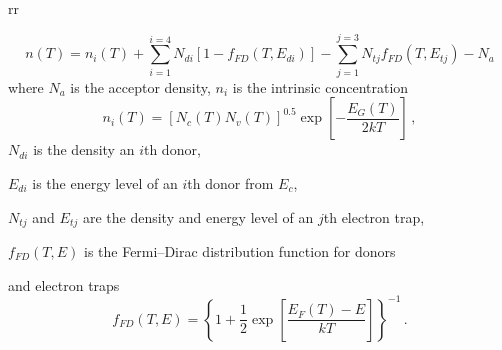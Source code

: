 \documentclass[14pt]{article}
\numberwithin{equation}{part}
\begin{document}
rr

\begin{equation*}
    n(T)=n_i(T)+\sum_{i=1}^{i=4}N_{di}[1-f_{FD}(T,E_{di})]-\sum_{j=1}^{j=3}N_{tj}f_{FD}(T,E_{tj})-N_a
\end{equation*}
where
$N_a$ is the acceptor density,
$n_i$ is the intrinsic concentration
\begin{equation*}
    n_i(T)=[N_c(T)N_v(T)]^{0.5}\exp\left[-\frac{E_G(T)}{2kT}\right]\,,
\end{equation*}
$N_{di}$ is the density an $i$th donor,

\noindent
$E_{di}$ is the energy level of an $i$th donor from $E_c$,

\noindent
$N_{tj}$ and $E_{tj}$ are the density and energy level of an $j$th electron trap,

\noindent
$f_{FD}(T,E)$ is the Fermi--Dirac distribution function for donors 

\noindent
and electron traps
\begin{equation*}
    f_{FD}(T,E)=\left\{1+\frac{1}{2}\exp\left[\frac{E_F(T)-E}{kT}\right]\right\}^{-1}\,.
\end{equation*}
\end{document}
